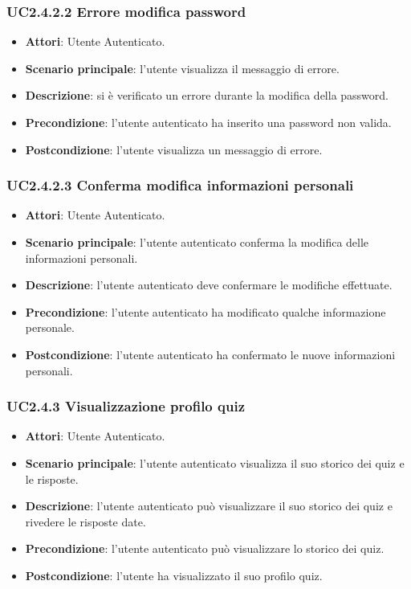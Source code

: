 \subsubsection{UC2.4.2.2 Errore modifica password}
\begin{itemize}
\item \textbf{Attori}: Utente Autenticato.
\item \textbf{Scenario principale}: l'utente visualizza il messaggio di errore.
\item \textbf{Descrizione}: si è verificato un errore durante la modifica della password.
\item \textbf{Precondizione}: l'utente autenticato ha inserito una password non valida.
\item \textbf{Postcondizione}: l'utente visualizza un messaggio di errore.
\end{itemize}
\subsubsection{UC2.4.2.3 Conferma modifica informazioni personali}
\begin{itemize}
\item \textbf{Attori}: Utente Autenticato.
\item \textbf{Scenario principale}: l'utente autenticato conferma la modifica delle informazioni personali.
\item \textbf{Descrizione}: l'utente autenticato deve confermare le modifiche effettuate.
\item \textbf{Precondizione}: l'utente autenticato ha modificato qualche informazione personale.
\item \textbf{Postcondizione}: l'utente autenticato ha confermato  le nuove informazioni personali.
\end{itemize}
\subsubsection{UC2.4.3 Visualizzazione profilo quiz}
\begin{itemize}
\item \textbf{Attori}: Utente Autenticato.
\item \textbf{Scenario principale}: l'utente autenticato visualizza il suo storico dei quiz e le risposte.
\item \textbf{Descrizione}: l'utente autenticato può visualizzare il suo storico dei quiz e rivedere le risposte date.
\item \textbf{Precondizione}: l'utente autenticato può visualizzare lo storico dei quiz.
\item \textbf{Postcondizione}: l'utente ha visualizzato il suo profilo quiz.
\end{itemize}
